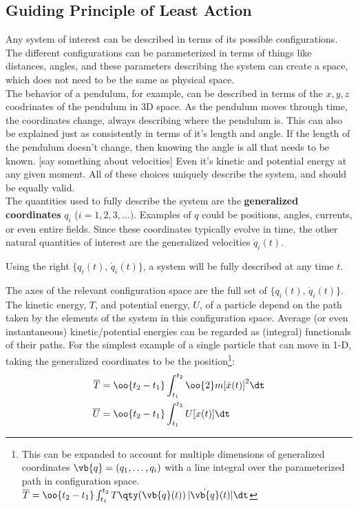 \newpage\subsection{Guiding Principle of Least Action}
Any system of interest can be described in terms of its possible configurations. The different configurations can be parameterized in terms of things like distances, angles, and these parameters describing the system can create a space, which does not need to be the same as physical space. 
\\
The behavior of a pendulum, for example, can be described in terms of the \(x,y,z\) coodrinates of the pendulum in 3D space. As the pendulum moves through time, the coordinates change, always describing where the pendulum is. This can also be explained just as consistently in terms of it's length and angle. If the length of the pendulum doesn't change, then knowing the angle is all that needs to be known. [say something about velocities]
Even it's kinetic and potential energy at any given moment. All of these choices uniquely describe the system, and should be equally valid. 
\\
The quantities used to fully describe the system are the \textbf{generalized coordinates} \(q_i\) (\(i=1,2,3,\ldots)\). Examples of \(q\) could be positions, angles, currents, or even entire fields. Since these coordinates typically evolve in time, the other natural quantities of interest are the generalized velocities \(\dot{q}_i(t)\). 
\begin{center}
	Using the right \(\{q_i(t),\,\dot{q}_i(t)\}\), a system will be fully described at any time \(t\).
\end{center}
The axes of the relevant configuration space are the full set of \(\{q_i(t),\,\dot{q}_i(t)\}\).
The kinetic energy, \(T\), and potential energy, \(U\), of a particle depend on the path taken by the elements of the system in this configuration space.
Average (or even instantaneous) kinetic/potential energies can be regarded as (integral) functionals of their paths. For the simplest example of a single particle that can move in 1-D, taking the generalized coordinates to be the position\footnote{	
	This can be expanded to account for multiple dimensions of generalized coordinates \(\vb{q}=(q_1,\ldots,q_i)\) with a line integral over the parameterized path in configuration space.
	\(\overline{T}=\oo{t_2-t_1} \int_{t_1}^{t_2}T\qty(\vb{q}(t))\,|\dot{\vb{q}}(t)|\dt\)
}:
\begin{align*}
	\overline{T}&=\oo{t_2-t_1} \int_{t_1}^{t_2}\oo{2}m{[\dot{x}(t)]}^2 \dt
	\\
	\overline{U}&= \oo{t_2-t_1} \int_{t_1}^{t_2}U[{x(t)}] \dt
\end{align*}


